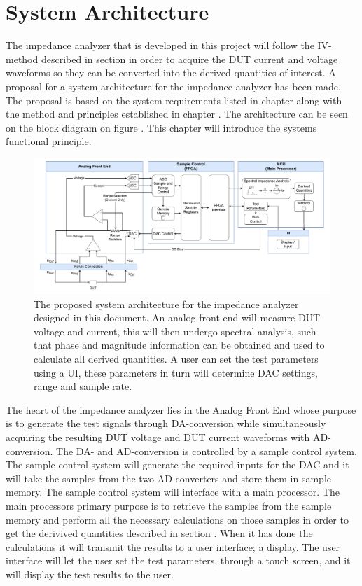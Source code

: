 \chapter{System Architecture} \label{ch:SysArchitecture}

The impedance analyzer that is developed in this project will follow the IV-method described in section  in order to acquire the DUT current and voltage waveforms so they can be converted into the derived quantities of interest. A proposal for a system architecture for the impedance analyzer has been made. The proposal is based on the system requirements listed in chapter  along with the method and principles established in chapter . The architecture can be seen on the block diagram on figure . This chapter will introduce the systems functional principle.

\begin{figure}[H]
    \centering
    \includegraphics[clip, trim=18 0 18 0,width=1.0\textwidth]{Sections/6_SystemArchitecture/Figures/SystemArchitecture.pdf}
    \caption{The proposed system architecture for the impedance analyzer designed in this document. An analog front end will measure DUT voltage and current, 
    this will then undergo spectral analysis, such that phase and magnitude information can be obtained and used to calculate all derived quantities. A user can set the test parameters using a UI, these parameters in turn will determine DAC settings, range and sample rate.}
    \label{fig_6_SysArchitecture}
\end{figure}

The heart of the impedance analyzer lies in the Analog Front End whose purpose is to generate the test signals through DA-conversion while simultaneously acquiring the resulting DUT voltage and DUT current waveforms with AD-conversion. The DA- and AD-conversion is controlled by a sample control system. The sample control system will generate the required inputs for the DAC and it will take the samples from the two AD-converters and store them in sample memory. The sample control system will interface with a main processor. The main processors primary purpose is to retrieve the samples from the sample memory and perform all the necessary calculations on those samples in order to get the derivived quantities described in section . When it has done the calculations it will transmit the results to a user interface; a display. The user interface will let the user set the test parameters, through a touch screen, and it will display the test results to the user.


